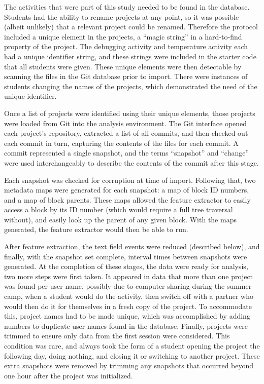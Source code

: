 The activities that were part of this study needed to be found in the database. Students had the ability to rename projects at any point, so it was possible (albeit unlikely) that a relevant project could be renamed. Therefore the protocol included a unique element in the projects, a ``magic string'' in a hard-to-find property of the project. The debugging activity and temperature activity each had a unique identifier string, and these strings were included in the starter code that all students were given. These unique elements were then detectable by scanning the files in the Git database prior to import. There were instances of students changing the names of the projects, which demonstrated the need of the unique identifier. 

Once a list of projects were identified using their unique elements, those projects were loaded from Git into the analysis environment. The Git interface opened each project's repository, extracted a list of all commits, and then checked out each commit in turn, capturing the contents of the files for each commit. A commit represented a single snapshot, and the terms ``snapshot'' and ``change'' were used interchangeably to describe the contents of the commit after this stage. 

Each snapshot was checked for corruption at time of import. Following that, two metadata maps were generated for each snapshot: a map of block ID numbers, and a map of block parents. These maps allowed the feature extractor to easily access a block by its ID number (which would require a full tree traversal without), and easily look up the parent of any given block. With the maps generated, the feature extractor would then be able to run. 

After feature extraction, the text field events were reduced (described below), and finally, with the snapshot set complete, interval times between snapshots were generated. At the completion of these stages, the data were ready for analysis, two more steps were first taken. It appeared in data that more than one project was found per user name, possibly due to computer sharing during the summer camp, when a student would do the activity, then switch off with a partner who would then do it for themselves in a fresh copy of the project. To accommodate this, project names had to be made unique, which was accomplished by adding numbers to duplicate user names found in the database. Finally, projects were trimmed to ensure only data from the first session were considered. This condition was rare, and always took the form of a student opening the project the following day, doing nothing, and closing it or switching to another project. These extra snapshots were removed by trimming any snapshots that occurred beyond one hour after the project was initialized. 

